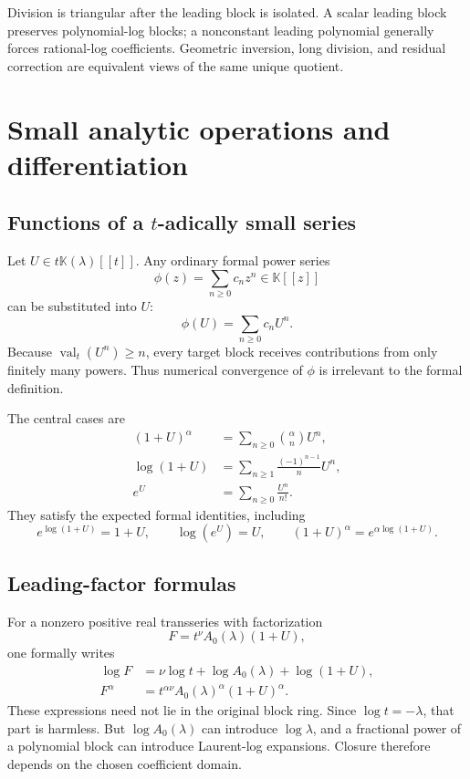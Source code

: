 \documentclass[11pt,openany]{book}
\theoremstyle{definition}
\theoremstyle{plain}
\theoremstyle{remark}
\newcommand{\K}{\mathbb{K}}
\DeclareMathOperator{\val}{val}
\begin{document}
\begin{summarybox}
Division is triangular after the leading block is isolated. A scalar leading block preserves polynomial-log blocks; a nonconstant leading polynomial generally forces rational-log coefficients. Geometric inversion, long division, and residual correction are equivalent views of the same unique quotient.
\end{summarybox}

\chapter{Small analytic operations and differentiation}\label{ch:elementary-functions}

\section{Functions of a \texorpdfstring{\(t\)}{t}-adically small series}
Let \(U\in t\K(\lambda)[[t]]\). Any ordinary formal power series
\[
 \phi(z)=\sum_{n\ge0}c_nz^n\in\K[[z]]
\]
can be substituted into \(U\):
\begin{equation}\label{eq:ordinary-substitution}
 \phi(U)=\sum_{n\ge0}c_nU^n.
\end{equation}
Because \(\val_t(U^n)\ge n\), every target block receives contributions from only finitely many powers. Thus numerical convergence of \(\phi\) is irrelevant to the formal definition.

The central cases are
\begin{align}
 (1+U)^\alpha&=\sum_{n\ge0}\binom{\alpha}{n}U^n,
 \label{eq:formal-binomial}\\
 \log(1+U)&=\sum_{n\ge1}\frac{(-1)^{n-1}}{n}U^n,
 \label{eq:formal-log}\\
 e^U&=\sum_{n\ge0}\frac{U^n}{n!}.
 \label{eq:formal-exp}
\end{align}
They satisfy the expected formal identities, including
\[
 e^{\log(1+U)}=1+U,
 \qquad
 \log(e^U)=U,
 \qquad
 (1+U)^\alpha=e^{\alpha\log(1+U)}.
\]

\section{Leading-factor formulas}
For a nonzero positive real transseries with factorization
\[
 F=t^\nu A_0(\lambda)(1+U),
\]
one formally writes
\begin{align}
 \log F&=\nu\log t+\log A_0(\lambda)+\log(1+U),\label{eq:log-leading-factor}\\
 F^\alpha&=t^{\alpha\nu}A_0(\lambda)^\alpha(1+U)^\alpha.
 \label{eq:power-leading-factor}
\end{align}
These expressions need not lie in the original block ring. Since \(\log t=-\lambda\), that part is harmless. But \(\log A_0(\lambda)\) can introduce \(\log\lambda\), and a fractional power of a polynomial block can introduce Laurent-log expansions. Closure therefore depends on the chosen coefficient domain.
\end{document}
